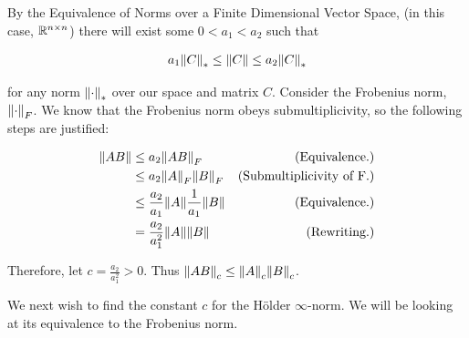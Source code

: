 \partbreak
\begin{solution}

    By the Equivalence of Norms over a Finite Dimensional Vector Space, (in this case, $\mathbb{R}^{n\times n}$) there will exist some $0< a_1 < a_2$ such that 

\begin{align}
     a_1\norm{C}_* \leq \norm{C} \leq a_2\norm{C}_* \label{p3a: equiv}
\end{align}

for any norm $\norm{\cdot}_*$ over our space and matrix $C$. Consider the Frobenius norm, $\norm{\cdot}_F$. We know that the Frobenius norm obeys submultiplicivity, so the following steps are justified:

\alignbreak
\begin{align}
    \norm{AB} &\leq a_2\norm{AB}_F   &\text{(Equivalence.)}\nonumber\\
    &\leq a_2\norm{A}_F\norm{B}_F    &\text{(Submultiplicivity of F.)}\nonumber\\
    &\leq \frac{a_2}{a_1}\norm{A}\frac{1}{a_1}\norm{B}  &\text{(Equivalence.)}\nonumber\\
    &= \frac{a_2}{a_1^2}\norm{A}\norm{B}    &\text{(Rewriting.)}\nonumber
\end{align}
\alignbreak

Therefore, let $c = \frac{a_2}{a_1^2} > 0$. Thus $\norm{AB}_c \leq \norm{A}_c\norm{B}_c$.


We next wish to find the constant $c$ for the H\"{o}lder $\infty$-norm. We will be looking at its equivalence to the Frobenius norm. 


\end{solution}

